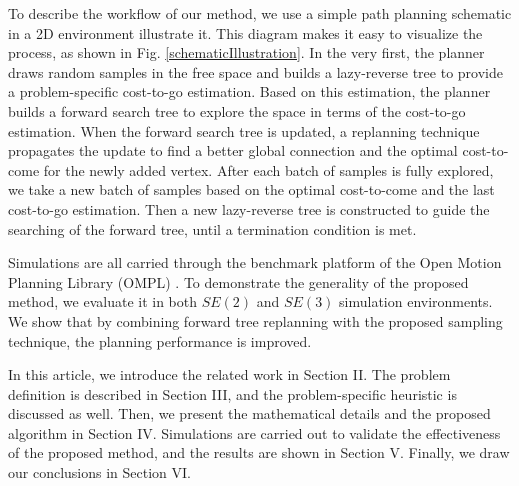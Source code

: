 To describe the workflow of our method, we use a simple path planning schematic in a 2D environment illustrate it.
This diagram makes it easy to visualize the process, as shown in Fig. \ref{schematicIllustration}.
In the very first, the planner draws random samples in the free space and builds a lazy-reverse tree to provide a problem-specific cost-to-go estimation. 
Based on this estimation, the planner builds a forward search tree to explore the space in terms of the cost-to-go estimation.
When the forward search tree is updated, a replanning technique propagates the update to find a better global connection and the optimal cost-to-come for the newly added vertex. 
After each batch of samples is fully explored, we take a new batch of samples based on the optimal cost-to-come and the last cost-to-go estimation.
Then a new lazy-reverse tree is constructed to guide the searching of the forward tree, until a termination condition is met.


Simulations are all carried through the benchmark platform of the Open Motion Planning Library (OMPL) \cite{sucan2012open} \cite{moll2015benchmarking}. 
To demonstrate the generality of the proposed method, we evaluate it in both $SE(2)$ and $SE(3)$ simulation environments.
We show that by combining forward tree replanning with the proposed sampling technique, the planning performance is improved.


In this article, we introduce the related work in Section II. 
The problem definition is described in Section III, and the problem-specific heuristic is discussed as well.
Then, we present the mathematical details and the proposed algorithm in Section IV. 
Simulations are carried out to validate the effectiveness of the proposed method, and the results are shown in Section V.  
Finally, we draw our conclusions in Section VI.
